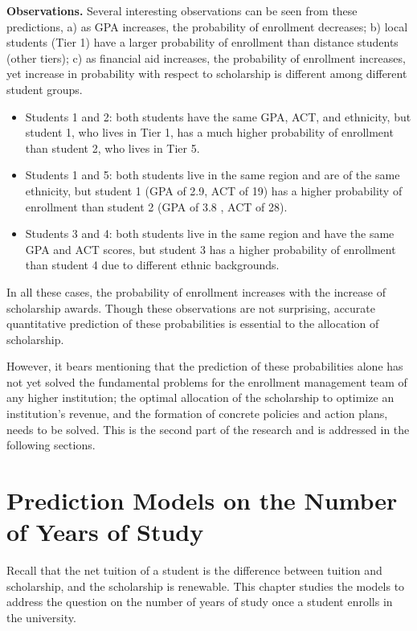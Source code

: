 \documentclass[12pt,english]{report}
\begin{document}
\vspace{0.15in}
\noindent \textbf{Observations.} Several interesting observations can be seen from these predictions, a) as GPA  increases, the probability of enrollment decreases; b) local students (Tier 1)  have a larger probability of enrollment than distance students (other tiers);  c) as financial aid increases, the probability of enrollment increases, yet  increase in probability with respect to scholarship is different among  different student groups.

\begin{itemize}
\item	Students 1 and 2: both students have the same GPA, ACT, and ethnicity, but student 1, who lives in Tier 1, has a much higher probability of enrollment than student 2, who lives in Tier 5.
\item Students 1 and 5: both students live in the same region and are of the same ethnicity, but student 1 (GPA of 2.9, ACT of 19) has a higher probability of enrollment than student 2 (GPA of 3.8 , ACT of 28).
\item Students 3 and 4: both students live in the same region and have the same GPA and ACT scores, but student 3 has a higher probability of enrollment than student 4 due to different ethnic backgrounds.
\end{itemize}

In all these cases, the probability of enrollment increases with the increase of scholarship awards. Though these observations are not surprising, accurate  quantitative prediction of these probabilities is essential to the allocation  of scholarship.

However, it  bears mentioning that the prediction of these probabilities alone  has not yet solved the fundamental problems for the enrollment management team  of any higher institution;  the optimal allocation of the scholarship to  optimize an institution's revenue, and the formation of concrete policies and  action plans,  needs to be solved. This is the second part of the research and  is addressed in the following sections.


\chapter {Prediction Models on the Number of Years of Study}
Recall that the net tuition of a student is the difference between tuition and scholarship, and the scholarship is renewable. This chapter studies the models to address the question on the number of years of study once a student enrolls in the university. 
\end{document}
